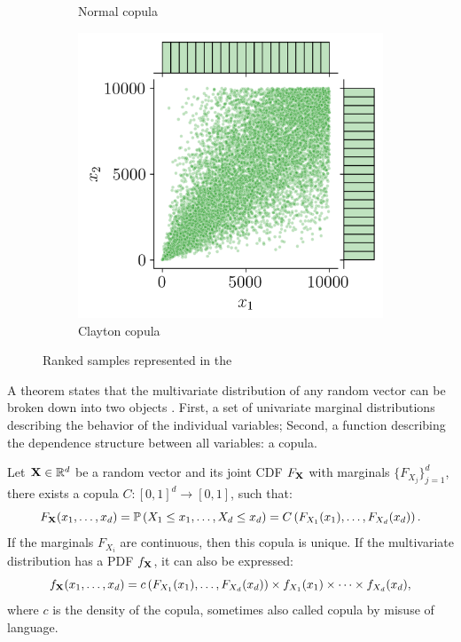 \begin{figure}
\begin{subfigure}[b]{0.32\textwidth}
        \caption{Normal copula}
    \end{subfigure}
    \hfill
    \begin{subfigure}[b]{0.32\textwidth}
        \centering
        \includegraphics[width=\textwidth]{../numerical_experiments/chapter1/figures/clayton_copula_ranked.png}
        \caption{Clayton copula}
    \end{subfigure}
       \caption{Ranked samples represented in the }
       \label{fig:ranked_joint_dist_samples}
\end{figure}

A theorem states that the multivariate distribution of any random vector can be broken down into two objects \citep{joe_1997}. 
First, a set of univariate marginal distributions describing the behavior of the individual variables;
Second, a function describing the dependence structure between all variables: a copula. 

\begin{theorem}
    Let $\mathbf{X} \in \mathbb{R}^d$ be a random vector and its joint CDF $F_{{\bf X}}$ with marginals $\{F_{X_j}\}_{j=1}^d$, there exists a copula $C: [0, 1]^d \rightarrow [0, 1]$, such that:
    \begin{equation}
        F_{{\bf X}}(x_1, \dots, x_d) = \mathbb{P}\left(X_1\leq x_1,\dots ,X_d\leq x_d\right) = C\left(F_{X_1}(x_1), \dots, F_{X_d}(x_d)\right). 
    \end{equation}
    If the marginals $F_{X_i}$ are continuous, then this copula is unique.
    If the multivariate distribution has a PDF $f_{{\bf X}}$, it can also be expressed:
    \begin{equation}
        f_{{\bf X}}(x_1, \dots, x_d) = c\left(F_{X_1}(x_1), \dots, F_{X_d}(x_d)\right) \times f_{X_1}(x_1) \times \dots \times f_{X_d}(x_d),
    \end{equation}
    where $c$ is the density of the copula, sometimes also called copula by misuse of language. 
    \label{thm:sklar}
\end{theorem}

